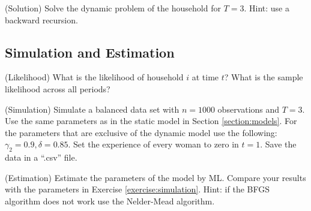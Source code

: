 \begin{exercise} (Solution)
Solve the dynamic problem of the household for $T=3$. Hint: use a backward recursion.
\end{exercise}

\subsection{Simulation and Estimation}

\begin{exercise} (Likelihood)
What is the likelihood of household $i$ at time $t$? What is the sample likelihood across all periods?
\end{exercise}

\begin{exercise} (Simulation) \label{exercise:simulation}
Simulate a balanced data set with $n = 1000$ observations and $T=3$. Use the same parameters as in the static model in Section \ref{section:models}. For the parameters that are exclusive of the dynamic model use the following: $\gamma_2 = 0.9,\delta = 0.85$. Set the experience of every woman to zero in $t=1$. Save the data in a ``.csv'' file.
\end{exercise}

\begin{exercise} (Estimation)
Estimate the parameters of the model by ML. Compare your results with the parameters in Exercise \ref{exercise:simulation}. Hint: if the BFGS algorithm does not work use the Nelder-Mead algorithm.
\end{exercise} 
